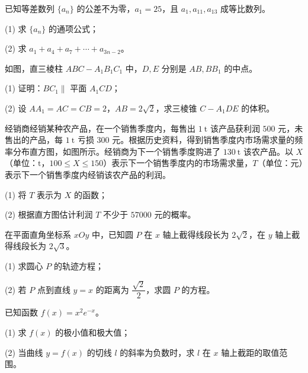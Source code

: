 \begin{question}
已知等差数列 $\{a_n\}$ 的公差不为零，$a_1=25$，且 $a_1,a_{11},a_{13}$ 成等比数列。

(1) 求 $\{a_n\}$ 的通项公式；

(2) 求 $a_1+a_4+a_7+\cdots+a_{3n-2}$。

\Needspace{0.4\textheight}
\end{question}
\begin{question}
如图，直三棱柱 $ABC-A_1B_1C_1$ 中，$D,E$ 分别是 $AB,BB_1$ 的中点。
\nopagebreak[4]
\begin{center}\end{center}
\nopagebreak[4]
(1) 证明：$BC_1\parallel$ 平面 $A_1CD$；

(2) 设 $AA_1=AC=CB=2$，$AB=2\sqrt2$，求三棱锥 $C-A_1DE$ 的体积。

\Needspace{0.4\textheight}
\end{question}
\begin{question}
经销商经销某种农产品，在一个销售季度内，每售出 $1\ \mathrm t$ 该产品获利润 $500$ 元，未售出的产品，每 $1\ \mathrm t$ 亏损 $300$ 元。根据历史资料，得到销售季度内市场需求量的频率分布直方图，如图所示。经销商为下一个销售季度购进了 $130\ \mathrm t$ 该农产品。以 $X$（单位：$\mathrm t$，$100\leqslant X\leqslant150$）表示下一个销售季度内的市场需求量，$T$（单位：元）表示下一个销售季度内经销该农产品的利润。
\nopagebreak[4]
\begin{center}\end{center}
\nopagebreak[4]
(1) 将 $T$ 表示为 $X$ 的函数；

(2) 根据直方图估计利润 $T$ 不少于 $57000$ 元的概率。

\end{question}
\begin{question}
在平面直角坐标系 $xOy$ 中，已知圆 $P$ 在 $x$ 轴上截得线段长为 $2\sqrt2$，在 $y$ 轴上截得线段长为 $2\sqrt3$。

(1) 求圆心 $P$ 的轨迹方程；

(2) 若 $P$ 点到直线 $y=x$ 的距离为 $\dfrac{\sqrt2}{2}$，求圆 $P$ 的方程。

\end{question}
\begin{question}
已知函数 $f(x)=x^2e^{-x}$。

(1) 求 $f(x)$ 的极小值和极大值；

(2) 当曲线 $y=f(x)$ 的切线 $l$ 的斜率为负数时，求 $l$ 在 $x$ 轴上截距的取值范围。

\Needspace{0.4\textheight}
\end{question}
